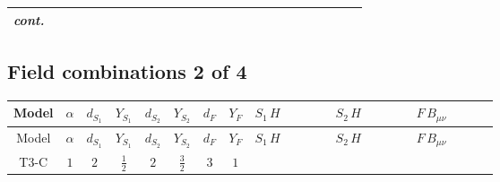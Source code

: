 \documentclass[8pt]{article}
\begin{document}
\begin{landscape}
\begin{longtable}{@{}cccccccc >{\raggedright\arraybackslash}p{0.21\linewidth} >{\raggedright\arraybackslash}p{0.21\linewidth} >{\raggedright\arraybackslash}p{0.21\linewidth}@{}}
\textit{cont.} &  &  &  &  &  &  &  & \scriptsize\adjustbox{max width=\linewidth}{$\begin{gathered} -\frac{4 \hbar  \log \left(\frac{\bar{\mu}^{2}}{m_2^2}\right) \overline{\lambda_5} H_{a_1} H_{a_2} m_2^2 \lambda_5 H_{a_1}{}^{\dagger } H_{a_2}{}^{\dagger }}{3 \left(m_1^2-m_2^2\right)}\end{gathered}$} &  &  \\
\midrule
\bottomrule
\end{longtable}
\clearpage
\subsection*{Field combinations 2 of 4}
\begin{longtable}{@{}cccccccc >{\raggedright\arraybackslash}p{0.21\linewidth} >{\raggedright\arraybackslash}p{0.21\linewidth} >{\raggedright\arraybackslash}p{0.21\linewidth}@{}}
\toprule
Model & $\alpha$ & $d_{S_1}$ & $Y_{S_1}$ & $d_{S_2}$ & $Y_{S_2}$ & $d_F$ & $Y_F$ & $S_1\,H$ & $S_2\,H$ & $F\,B_{\mu\nu}$ \\
\midrule
\endfirsthead
\toprule
Model & $\alpha$ & $d_{S_1}$ & $Y_{S_1}$ & $d_{S_2}$ & $Y_{S_2}$ & $d_F$ & $Y_F$ & $S_1\,H$ & $S_2\,H$ & $F\,B_{\mu\nu}$ \\
\midrule
\endhead
T3-C & $1$ & $2$ & $\frac{1}{2}$ & $2$ & $\frac{3}{2}$ & $3$ & $1$ & \scriptsize\adjustbox{max width=\linewidth}{$\begin{gathered} +\frac{\hbar  H_{a_1} H_{a_2} H_{a_1}{}^{\dagger } H_{a_2}{}^{\dagger } \left(\lambda_{HS_1}^{(1)}^{(1)}\right){}^2}{2 \epsilon } \\ +\frac{1}{2} \hbar  \log \left(\frac{\bar{\mu}^{2}}{m_1^2}\right) H_{a_1} H_{a_2} H_{a_1}{}^{\dagger } H_{a_2}{}^{\dagger } \left(\lambda_{HS_1}^{(1)}^{(1)}\right){}^2 \\ +\frac{5 \hbar  H_{a_1} H_{a_2} H_{a_1}{}^{\dagger } H_{a_2}{}^{\dagger } \left(\lambda_{HS_1}^{(1)}^{(2)}\right){}^2}{6 \epsilon }\end{gathered}$} & \scriptsize\adjustbox{max width=\linewidth}{$\begin{gathered} +\frac{\hbar  H_{a_1} H_{a_2} H_{a_1}{}^{\dagger } H_{a_2}{}^{\dagger } \left(\lambda_{HS_2}^{(1)}^{(1)}\right){}^2}{2 \epsilon } \\ +\frac{1}{2} \hbar  \log \left(\frac{\bar{\mu}^{2}}{m_2^2}\right) H_{a_1} H_{a_2} H_{a_1}{}^{\dagger } H_{a_2}{}^{\dagger } \left(\lambda_{HS_2}^{(1)}^{(1)}\right){}^2 \\ +\frac{5 \hbar  H_{a_1} H_{a_2} H_{a_1}{}^{\dagger } H_{a_2}{}^{\dagger } \left(\lambda_{HS_2}^{(1)}^{(2)}\right){}^2}{6 \epsilon }\end{gathered}$} & \scriptsize\adjustbox{max width=\linewidth}{$\begin{gathered} -3 \hbar  \log \left(\frac{\bar{\mu}^{2}}{M_F^2}\right) B_{\mu _1\mu _2}^2\end{gathered}$} \\

\end{longtable}
\end{landscape}
\end{document}
